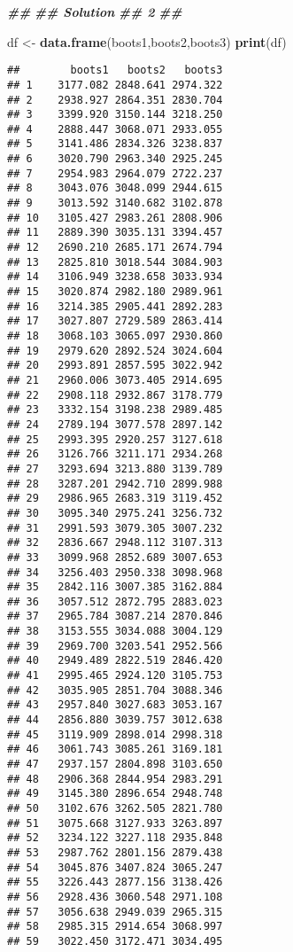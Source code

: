 \documentclass[
]{article}
\newenvironment{Shaded}{\begin{snugshade}}{\end{snugshade}}
\newcommand{\DocumentationTok}[1]{\textcolor[rgb]{0.56,0.35,0.01}{\textbf{\textit{#1}}}}
\newcommand{\FunctionTok}[1]{\textcolor[rgb]{0.13,0.29,0.53}{\textbf{#1}}}
\newcommand{\NormalTok}[1]{#1}
\newcommand{\OtherTok}[1]{\textcolor[rgb]{0.56,0.35,0.01}{#1}}
\begin{document}
\begin{Shaded}
\begin{Highlighting}[]
\DocumentationTok{\#\#}
\DocumentationTok{\#\#  Solution}
\DocumentationTok{\#\#      2}
\DocumentationTok{\#\#}


\NormalTok{df }\OtherTok{\textless{}{-}} \FunctionTok{data.frame}\NormalTok{(boots1,boots2,boots3)}
\FunctionTok{print}\NormalTok{(df)}
\end{Highlighting}
\end{Shaded}

\begin{verbatim}
##        boots1   boots2   boots3
## 1    3177.082 2848.641 2974.322
## 2    2938.927 2864.351 2830.704
## 3    3399.920 3150.144 3218.250
## 4    2888.447 3068.071 2933.055
## 5    3141.486 2834.326 3238.837
## 6    3020.790 2963.340 2925.245
## 7    2954.983 2964.079 2722.237
## 8    3043.076 3048.099 2944.615
## 9    3013.592 3140.682 3102.878
## 10   3105.427 2983.261 2808.906
## 11   2889.390 3035.131 3394.457
## 12   2690.210 2685.171 2674.794
## 13   2825.810 3018.544 3084.903
## 14   3106.949 3238.658 3033.934
## 15   3020.874 2982.180 2989.961
## 16   3214.385 2905.441 2892.283
## 17   3027.807 2729.589 2863.414
## 18   3068.103 3065.097 2930.860
## 19   2979.620 2892.524 3024.604
## 20   2993.891 2857.595 3022.942
## 21   2960.006 3073.405 2914.695
## 22   2908.118 2932.867 3178.779
## 23   3332.154 3198.238 2989.485
## 24   2789.194 3077.578 2897.142
## 25   2993.395 2920.257 3127.618
## 26   3126.766 3211.171 2934.268
## 27   3293.694 3213.880 3139.789
## 28   3287.201 2942.710 2899.988
## 29   2986.965 2683.319 3119.452
## 30   3095.340 2975.241 3256.732
## 31   2991.593 3079.305 3007.232
## 32   2836.667 2948.112 3107.313
## 33   3099.968 2852.689 3007.653
## 34   3256.403 2950.338 3098.968
## 35   2842.116 3007.385 3162.884
## 36   3057.512 2872.795 2883.023
## 37   2965.784 3087.214 2870.846
## 38   3153.555 3034.088 3004.129
## 39   2969.700 3203.541 2952.566
## 40   2949.489 2822.519 2846.420
## 41   2995.465 2924.120 3105.753
## 42   3035.905 2851.704 3088.346
## 43   2957.840 3027.683 3053.167
## 44   2856.880 3039.757 3012.638
## 45   3119.909 2898.014 2998.318
## 46   3061.743 3085.261 3169.181
## 47   2937.157 2804.898 3103.650
## 48   2906.368 2844.954 2983.291
## 49   3145.380 2896.654 2948.748
## 50   3102.676 3262.505 2821.780
## 51   3075.668 3127.933 3263.897
## 52   3234.122 3227.118 2935.848
## 53   2987.762 2801.156 2879.438
## 54   3045.876 3407.824 3065.247
## 55   3226.443 2877.156 3138.426
## 56   2928.436 3060.548 2971.108
## 57   3056.638 2949.039 2965.315
## 58   2985.315 2914.654 3068.997
## 59   3022.450 3172.471 3034.495

\end{verbatim}
\end{document}
